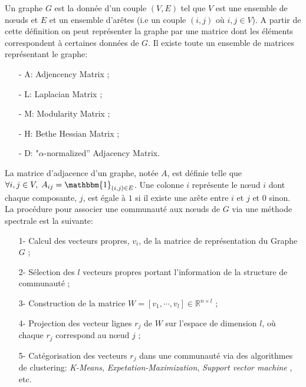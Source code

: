 Un graphe $G$ est la donnée d'un couple $(V, E)$ tel que $V$ est une ensemble de nœuds et $E$ et un ensemble d'arêtes (i.e un couple $(i,j)$ où $i,j \in V$).
A partir de cette définition on peut représenter la graphe par une matrice dont les éléments correspondent à certaines données de $G$.
Il existe toute un ensemble de matrices représentant le graphe:
\begin{itemize}
  	\item[-] A: Adjencency Matrix ;
  	\item[-] L: Laplacian Matrix ;
  	\item[-] M: Modularity Matrix ;
  	\item[-] H: Bethe Hessian Matrix ;
  	\item[-] D: "$\alpha$-normalized” Adjacency Matrix.\\
\end{itemize}
La matrice d'adjacence d'un graphe, notée $A$, est définie telle que $\forall i,j \in V, \; A_{ij} = \mathbbm{1}_{(i,j) \in E}$.
Une colonne $i$ représente le nœud $i$ dont chaque composante, $j$, est égale à $1$ si il existe une arête entre $i$ et $j$ et $0$ sinon.\\
La procédure pour associer une communauté aux nœuds de $G$ via une méthode spectrale est la suivante: 
\begin{itemize}
	\item[1-] Calcul des vecteurs propres, $v_i$, de la matrice de représentation du Graphe $G$ ;
	\item[2-] Sélection des $l$ vecteurs propres portant l'information de la structure de communauté ; 
	\item[3-] Construction de la matrice $W = [v_1, \cdots, v_l] \in \mathbb{R}^{n\times l}$ ; 
	\item[4-] Projection des vecteur lignes $r_j$ de $W$ sur l'espace de dimension $l$, où chaque $r_j$ correspond  au nœud $j$ ; 
	\item[5-] Catégorisation des vecteurs $r_j $ dans une communauté via des algorithmes de clustering: \textit{K-Means}, \textit{Expetation-Maximization}, \textit{Support vector machine }, etc.\\
\end{itemize}

